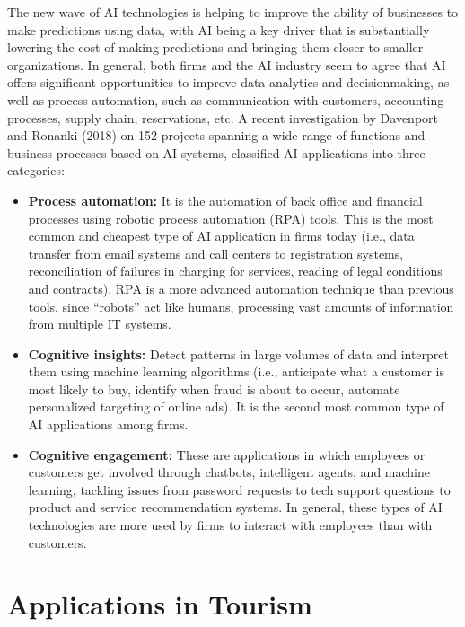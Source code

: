 \documentclass[
  letterpaper,
  DIV=11,
  numbers=noendperiod]{scrreprt}
\begin{document}
The new wave of AI technologies is helping to improve the ability of
businesses to make predictions using data, with AI being a key driver
that is substantially lowering the cost of making predictions and
bringing them closer to smaller organizations. In general, both firms
and the AI industry seem to agree that AI offers significant
opportunities to improve data analytics and decisionmaking, as well as
process automation, such as communication with customers, accounting
processes, supply chain, reservations, etc. A recent investigation by
Davenport and Ronanki (2018) on 152 projects spanning a wide range of
functions and business processes based on AI systems, classified AI
applications into three categories:

\begin{itemize}
\item
  \textbf{Process automation:} It is the automation of back office and
  financial processes using robotic process automation (RPA) tools. This
  is the most common and cheapest type of AI application in firms today
  (i.e., data transfer from email systems and call centers to
  registration systems, reconciliation of failures in charging for
  services, reading of legal conditions and contracts). RPA is a more
  advanced automation technique than previous tools, since ``robots''
  act like humans, processing vast amounts of information from multiple
  IT systems.
\item
  \textbf{Cognitive insights:} Detect patterns in large volumes of data
  and interpret them using machine learning algorithms (i.e., anticipate
  what a customer is most likely to buy, identify when fraud is about to
  occur, automate personalized targeting of online ads). It is the
  second most common type of AI applications among firms.
\item
  \textbf{Cognitive engagement:} These are applications in which
  employees or customers get involved through chatbots, intelligent
  agents, and machine learning, tackling issues from password requests
  to tech support questions to product and service recommendation
  systems. In general, these types of AI technologies are more used by
  firms to interact with employees than with customers.
\end{itemize}

\hypertarget{applications-in-tourism}{%
\section{Applications in Tourism}\label{applications-in-tourism}}
\end{document}
